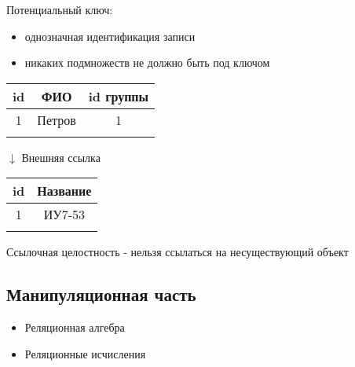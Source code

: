 \documentclass[a4paper, 14pt]{report}
\begin{document}
    Потенциальный ключ:

    \begin{itemize}
        \item однозначная идентификация записи
        \item никаких подмножеств не должно быть под ключом
    \end{itemize}

    \begin{center}
        \begin{tabular}{|c|c|c|}
            \hline
            id & ФИО & id группы \\
            \hline
            1 & Петров & 1 \\
            \hline
            & & \\
            \hline
        \end{tabular}

        $\downarrow$ Внешняя ссылка

        \begin{tabular}{|c|c|}
            \hline
            id & Название \\
            \hline
            1 & ИУ7-53 \\
            \hline
            & \\
            \hline
        \end{tabular}
    \end{center}

    Ссылочная целостность - нельзя ссылаться на несуществующий объект

    \subsection{Манипуляционная часть}

    \begin{itemize}
        \item Реляционная алгебра
        \item Реляционные исчисления
    \end{itemize}
\end{document}
